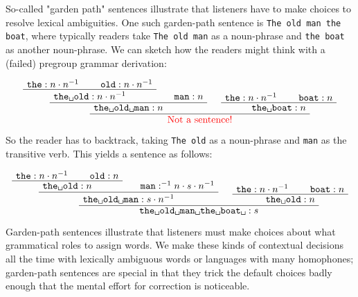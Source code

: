 \begin{example}
So-called "garden path" sentences illustrate that listeners have to make choices to resolve lexical ambiguities. One such garden-path sentence is \texttt{The old man the boat}, where typically readers take \texttt{The old man} as a noun-phrase and \texttt{the boat} as another noun-phrase. We can sketch how the readers might think with a (failed) pregroup grammar derivation:

\[
\AxiomC{$\texttt{the} : n \cdot n^{-1}$}
\AxiomC{$\texttt{old} : n \cdot n^{-1}$}
\BinaryInfC{$\texttt{the\textvisiblespace old}: n \cdot n^{-1}$}
\AxiomC{$\texttt{man} : n$}
\BinaryInfC{$\texttt{the\textvisiblespace old\textvisiblespace man}: n$}
\AxiomC{$\texttt{the} : n \cdot n^{-1}$}
\AxiomC{$\texttt{boat} : n$}
\BinaryInfC{$\texttt{the\textvisiblespace boat}: n$}
\BinaryInfC{\textcolor{red}{Not a sentence!}}
\DisplayProof
\]

So the reader has to backtrack, taking \texttt{The old} as a noun-phrase and \texttt{man} as the transitive verb. This yields a sentence as follows:

\[
\AxiomC{$\texttt{the} : n \cdot n^{-1}$}
\AxiomC{$\texttt{old} : n$}
\BinaryInfC{$\texttt{the\textvisiblespace old}: n$}
\AxiomC{$\texttt{man} : ^{-1}n \cdot s \cdot n^{-1}$}
\BinaryInfC{$\texttt{the\textvisiblespace old\textvisiblespace man}: s \cdot n^{-1}$}
\AxiomC{$\texttt{the} : n \cdot n^{-1}$}
\AxiomC{$\texttt{boat} : n$}
\BinaryInfC{$\texttt{the\textvisiblespace old}: n$}
\BinaryInfC{$\texttt{the\textvisiblespace old\textvisiblespace man\textvisiblespace the\textvisiblespace boat\textvisiblespace}: s$}
\DisplayProof
\]

Garden-path sentences illustrate that listeners must make choices about what grammatical roles to assign words. We make these kinds of contextual decisions all the time with lexically ambiguous words or languages with many homophones; garden-path sentences are special in that they trick the default choices badly enough that the mental effort for correction is noticeable.
\end{example}

